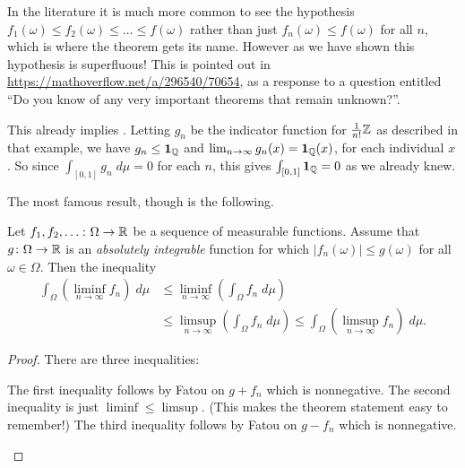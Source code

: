 \begin{remark}
	In the literature it is much more common
	to see the hypothesis $f_1(\omega) \le f_2(\omega) \le \dots \le f(\omega)$
	rather than just $f_n(\omega) \le f(\omega)$ for all $n$,
	which is where the theorem gets its name.
	However as we have shown this hypothesis is superfluous!
	This is pointed out in \url{https://mathoverflow.net/a/296540/70654},
	as a response to a question entitled
	``Do you know of any very important theorems that remain unknown?''.
\end{remark}

\begin{example}
	This already implies .
	Letting $g_n$ be the indicator function for $\frac1{n!}\mathbb Z$
	as described in that example, we have $g_n \le \mathbf{1}_\mathbb Q$
	and $\lim_{n \to \infty} g_n(x) = \mathbf{1}_\mathbb Q(x)$,
	for each individual $x$.
	So since $\int_{[0,1]} g_n \; d\mu = 0$ for each $n$,
	this gives $\int_{[0,1]} \mathbf{1}_\mathbb Q = 0$ as we already knew.
\end{example}

The most famous result, though is the following.
\begin{corollary}
	Let $f_1, f_2, \dots \colon \Omega \to \mathbb R$
	be a sequence of measurable functions.
	Assume that $g \colon \Omega \to \mathbb R$ is an
	\emph{absolutely integrable} function for which
	$|f_n(\omega)| \le g(\omega)$ for all $\omega \in \Omega$.
	Then the inequality
	\begin{align*}
		\int_\Omega \left( \liminf_{n \to \infty} f_n \right) \; d\mu
		&\le \liminf_{n \to \infty} \left( \int_\Omega f_n \; d\mu \right) \\
		&\le \limsup_{n \to \infty} \left( \int_\Omega f_n \; d\mu \right)
		\le \int_\Omega \left( \limsup_{n \to \infty} f_n \right) \; d\mu.
	\end{align*}
\end{corollary}
\begin{proof}
	There are three inequalities:
	\begin{itemize}
		\ii The first inequality follows by Fatou on $g + f_n$ which is nonnegative.
		\ii The second inequality is just $\liminf \le \limsup$.
		(This makes the theorem statement easy to remember!)
		\ii The third inequality follows by Fatou on $g - f_n$ which is nonnegative.
		\qedhere
	\end{itemize}
\end{proof}

